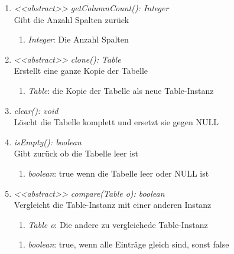 \begin{enumerate}[+]
	\item \textit{<{<abstract>}> getColumnCount(): Integer} \\
	Gibt die Anzahl Spalten zurück
	\vspace{-0.2cm}
	\begin{enumerate}[$\circ$]
		\item \textit{Integer}: Die Anzahl Spalten
	\end{enumerate}

	\item \textit{<{<abstract>}> clone(): Table} \\
	Erstellt eine ganze Kopie der Tabelle
	\vspace{-0.2cm}
	\begin{enumerate}[$\circ$]
		\item \textit{Table}: die Kopie der Tabelle als neue Table-Instanz
	\end{enumerate}

	\item \textit{clear(): void} \\
	Löscht die Tabelle komplett und ersetzt sie gegen NULL

	\item \textit{isEmpty(): boolean} \\
	Gibt zurück ob die Tabelle leer ist
	\vspace{-0.2cm}
	\begin{enumerate}[$\circ$]
		\item \textit{boolean}: true wenn die Tabelle leer oder NULL ist
	\end{enumerate}

	\item \textit{<{<abstract>}> compare(Table o): boolean} \\
	Vergleicht die Table-Instanz mit einer anderen Instanz
	\begin{enumerate}[$\bullet$]
		\item \textit{Table o}: Die andere zu vergleichede Table-Instanz
	\end{enumerate}
	\vspace{-0.2cm}
	\begin{enumerate}[$\circ$]
		\item \textit{boolean}: true, wenn alle Einträge gleich sind, sonst false
	\end{enumerate}
\end{enumerate}